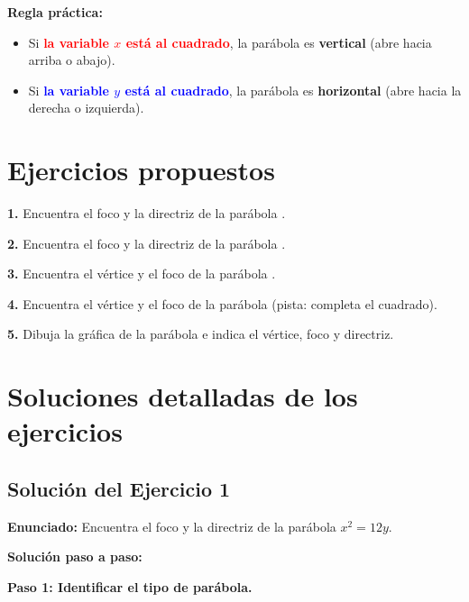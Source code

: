 \documentclass[12pt,a4paper]{article}
\begin{document}
	\bigskip

	\textbf{Regla práctica:}
	\begin{itemize}
		\item Si \textcolor{red}{\textbf{la variable \(x\) está al cuadrado}}, la parábola es \textbf{vertical} (abre hacia arriba o abajo).
		\item Si \textcolor{blue}{\textbf{la variable \(y\) está al cuadrado}}, la parábola es \textbf{horizontal} (abre hacia la derecha o izquierda).
	\end{itemize}

	\section{Ejercicios propuestos}

	\textbf{1.} Encuentra el foco y la directriz de la parábola  {\color{red}{\(x^2=12y\)}}.

	\bigskip

	\textbf{2.} Encuentra el foco y la directriz de la parábola {\color{red}{\(y^2=-8x\)}}.

	\bigskip

	\textbf{3.} Encuentra el vértice y el foco de la parábola {\color{red}{\((x+3)^2=16(y-2)\)}}.

	\bigskip

	\textbf{4.} Encuentra el vértice y el foco de la parábola {\color{red}{\(y^2+6y-4x+1=0\)}} (pista: completa el cuadrado).

	\bigskip

	\textbf{5.} Dibuja la gráfica de la parábola {\color{red}{\(x^2=-4y\)}} e indica el vértice, foco y directriz.

	\bigskip
	\bigskip

	\section{Soluciones detalladas de los ejercicios}

	\subsection*{Solución del Ejercicio 1}

	\textbf{Enunciado:} Encuentra el foco y la directriz de la parábola \(x^2=12y\).

	\bigskip

	\textbf{Solución paso a paso:}

	\bigskip

	\textbf{Paso 1: Identificar el tipo de parábola.}
\end{document}
